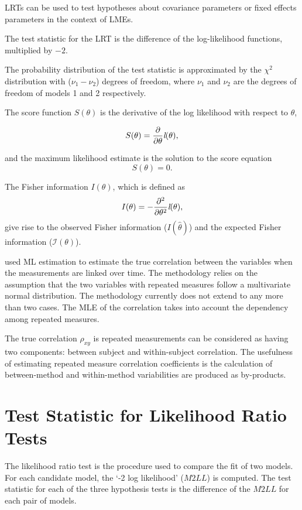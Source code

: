 \documentclass[12pt, a4paper]{report}
\theoremstyle{plain}
\theoremstyle{definition}
\theoremstyle{remark}
\begin{document}
LRTs can be used to test hypotheses about
covariance parameters or fixed effects parameters in the context
of LMEs.

The test statistic for the LRT is the difference of the log-likelihood functions, multiplied by $-2$.

The probability distribution of the test statistic is approximated by the $\chi^2$ distribution with ($\nu_{1} - \nu_{2}$) degrees of freedom, where $\nu_{1}$  and $\nu_{2}$ are the degrees of freedom of models 1 and 2 respectively.



The score function $S(\theta)$ is the derivative of the log likelihood with respect to $\theta$,

\[
S(\theta) = \frac{\partial}{\partial \theta}\emph{l}(\theta),
\]

and the maximum likelihood estimate is the solution to the score equation
\[
S(\theta) = 0.
\]


The Fisher information $I(\theta)$, which is defined as
\[
I(\theta) = - \frac{\partial^2}{\partial \theta^2}\emph{l}(\theta),
\]
give rise to the observed Fisher information ($I(\hat{\theta})$) and the expected Fisher information ($\mathcal{I}(\theta)$).




\citet{Lam} used ML estimation to estimate the true correlation between the variables when
the measurements are linked over time. The methodology relies on the assumption that the two variables with repeated measures follow a multivariate normal distribution. The methodology currently does not extend to any more than two cases. The MLE of the correlation takes into account the dependency among repeated measures.

The true correlation $\rho_{xy}$ is repeated measurements can be considered as having two components: between subject and within-subject correlation. The usefulness of estimating repeated measure correlation coefficients is the calculation of between-method and within-method variabilities are produced as by-products.

\section{Test Statistic for Likelihood Ratio Tests}
The likelihood ratio test is the procedure used to compare the fit of two models. For each candidate model, the `-2 log likelihood' ($M2LL$) is computed. The test statistic for each of the three hypothesis tests is the difference of the $M2LL$ for each pair of models. 
\end{document}
